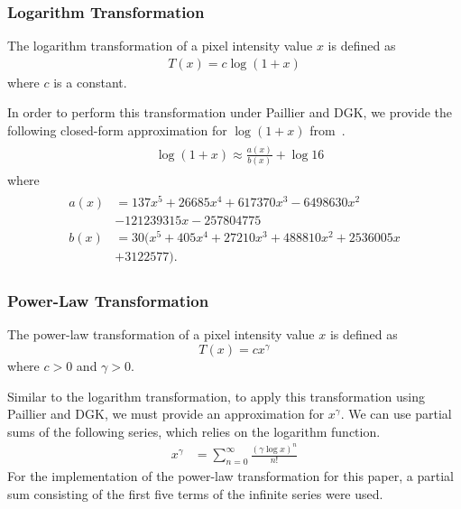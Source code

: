 \subsubsection{Logarithm Transformation}
The logarithm transformation of a pixel intensity value $x$ is defined as
\begin{align}
	T\left(x\right) = c \log\left(1 + x\right)
\end{align}
where $c$ is a constant.

In order to perform this transformation under Paillier and DGK, we provide the following closed-form approximation for $\log\left(1 + x\right)$ from~\cite{pcsc-paper}.
\begin{align}\label{eq:optimal_log_approximation}
	\begin{split}
		&\log\left(1+x\right) \approx \frac{a(x)}{b(x)} + \log{16}
	\end{split}
\end{align}
where
\begin{align*}
	\begin{split}
	a(x) &= 137x^5 + 26685x^4 + 617370x^3 - 6498630x^2 \\
	&- 121239315x - 257804775\\
	b(x) &= 30(x^5 + 405x^4 + 27210x^3 + 488810x^2 + 2536005x \\
	&+ 3122577).
	\end{split}
\end{align*}

\subsubsection{Power-Law Transformation}
The power-law transformation of a pixel intensity value $x$ is defined as
\begin{equation}
    T\left(x\right) = cx^{\gamma}
\end{equation}
where $c>0$ and $\gamma > 0$.

Similar to the logarithm transformation, to apply this transformation using Paillier and DGK, we must provide an approximation for $x^\gamma$.
We can use partial sums of the following series, which relies on the logarithm function.
\begin{align}
	x^\gamma &= \sum_{n=0}^{\infty}{\frac{(\gamma\log{x})^n}{n!}}
\end{align}
For the implementation of the power-law transformation for this paper, a partial sum consisting of the first five terms of the infinite series were used.

